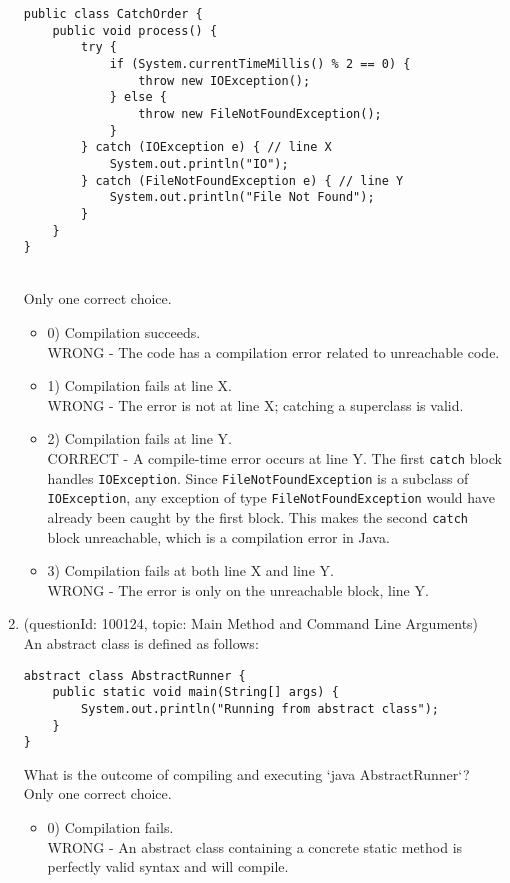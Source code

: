 \documentclass[12pt]{article}
\begin{document}
\begin{enumerate}[label=(\arabic*)]
\begin{verbatim}
public class CatchOrder {
    public void process() {
        try {
            if (System.currentTimeMillis() % 2 == 0) {
                throw new IOException();
            } else {
                throw new FileNotFoundException();
            }
        } catch (IOException e) { // line X
            System.out.println("IO");
        } catch (FileNotFoundException e) { // line Y
            System.out.println("File Not Found");
        }
    }
}
\end{verbatim}
\\ \noindent Only one correct choice. 
\begin{itemize}
\item 0) Compilation succeeds.
 \\ 
WRONG - The code has a compilation error related to unreachable code.

\item 1) Compilation fails at line X.
 \\ 
WRONG - The error is not at line X; catching a superclass is valid.

\item 2) Compilation fails at line Y.
 \\ 
CORRECT - A compile-time error occurs at line Y. The first \verb|catch| block handles \verb|IOException|. Since \verb|FileNotFoundException| is a subclass of \verb|IOException|, any exception of type \verb|FileNotFoundException| would have already been caught by the first block. This makes the second \verb|catch| block unreachable, which is a compilation error in Java.

\item 3) Compilation fails at both line X and line Y.
 \\ 
WRONG - The error is only on the unreachable block, line Y.

\end{itemize}
\item (questionId: 100124, topic: Main Method and Command Line Arguments) \\ 
An abstract class is defined as follows:
\begin{verbatim}
abstract class AbstractRunner {
    public static void main(String[] args) {
        System.out.println("Running from abstract class");
    }
}
\end{verbatim}
What is the outcome of compiling and executing `java AbstractRunner`?
\\ \noindent Only one correct choice. 
\begin{itemize}
\item 0) Compilation fails.
 \\ 
WRONG - An abstract class containing a concrete static method is perfectly valid syntax and will compile.


\end{itemize}
\end{enumerate}
\end{document}
